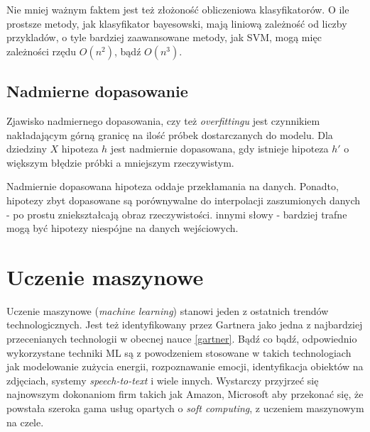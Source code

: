 \documentclass[12pt,a4paper,oneside]{report} %
\begin{document}
Nie mniej ważnym faktem jest też złożoność obliczeniowa klasyfikatorów. O ile prostsze metody, jak klasyfikator bayesowski, mają liniową zależność od liczby przykladów, o tyle bardziej zaawansowane metody, jak SVM, mogą mięc zależności rzędu $O(n^2)$, bądź $O(n^3)$. \par


\subsection{Nadmierne dopasowanie}

Zjawisko nadmiernego dopasowania, czy też \emph{overfittingu} jest czynnikiem nakładającym górną granicę na ilość próbek dostarczanych do modelu. Dla dziedziny $X$ hipoteza $h$ jest nadmiernie dopasowana, gdy istnieje hipoteza $h'$ o większym błędzie próbki a mniejszym rzeczywistym. \cite{cichosz} \par

Nadmiernie dopasowana hipoteza oddaje przekłamania na danych. Ponadto, hipotezy zbyt dopasowane są porównywalne do interpolacji zaszumionych danych - po prostu zniekształcają obraz rzeczywistości. innymi słowy - bardziej trafne mogą być hipotezy niespójne na danych wejściowych.\par












\section{Uczenie maszynowe}

Uczenie maszynowe (\emph{machine learning}) stanowi jeden z ostatnich trendów technologicznych. Jest też identyfikowany przez Gartnera jako jedna z najbardziej przecenianych technologii w obecnej nauce \ref{gartner}. Bądź co bądź, odpowiednio wykorzystane techniki ML są z powodzeniem stosowane w takich technologiach jak modelowanie zużycia energii, rozpoznawanie emocji, identyfikacja obiektów na zdjęciach, systemy \emph{speech-to-text} i wiele innych. Wystarczy przyjrzeć się najnowszym dokonaniom firm takich jak Amazon, Microsoft aby przekonać się, że powstała szeroka gama usług opartych o \emph{soft computing}, z uczeniem maszynowym na czele. \par
\end{document}
